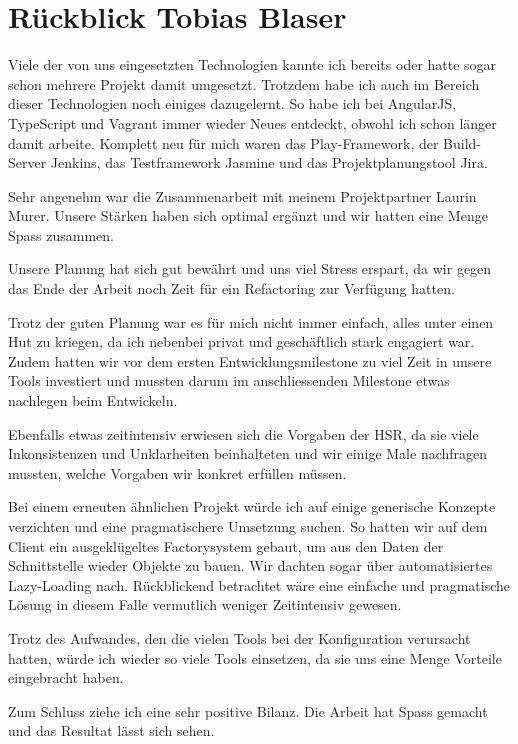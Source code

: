 	\section*{Rückblick Tobias Blaser}
		
		
		Viele der von uns eingesetzten Technologien kannte ich bereits oder hatte sogar schon mehrere Projekt damit umgesetzt.
		Trotzdem habe ich auch im Bereich dieser Technologien noch einiges dazugelernt.
		So habe ich bei AngularJS, TypeScript und Vagrant immer wieder Neues entdeckt, obwohl ich schon länger damit arbeite.
		Komplett neu für mich waren das Play-Framework, der Build-Server Jenkins, das Testframework Jasmine und das Projektplanungstool Jira.
		
		
		Sehr angenehm war die Zusammenarbeit mit meinem Projektpartner Laurin Murer. Unsere Stärken haben sich optimal ergänzt und wir hatten eine Menge Spass zusammen.
		
		Unsere Planung hat sich gut bewährt und uns viel Stress erspart, da wir gegen das Ende der Arbeit noch Zeit für ein Refactoring zur Verfügung hatten.
		
		
		Trotz der guten Planung war es für mich nicht immer einfach, alles unter einen Hut zu kriegen, da ich nebenbei privat und geschäftlich stark engagiert war.
		Zudem hatten wir vor dem ersten Entwicklungsmilestone zu viel Zeit in unsere Tools investiert und mussten darum im anschliessenden Milestone etwas nachlegen beim Entwickeln.
		
		Ebenfalls etwas zeitintensiv erwiesen sich die Vorgaben der HSR, da sie viele Inkonsistenzen und Unklarheiten beinhalteten und wir einige Male nachfragen mussten, welche Vorgaben wir konkret erfüllen müssen.
		
		
		Bei einem erneuten ähnlichen Projekt würde ich auf einige generische Konzepte verzichten und eine pragmatischere Umsetzung suchen. So hatten wir auf dem Client ein ausgeklügeltes Factorysystem gebaut, um aus den Daten der Schnittstelle wieder Objekte zu bauen.
		Wir dachten sogar über automatisiertes Lazy-Loading nach. 
		Rückblickend betrachtet wäre eine einfache und pragmatische Lösung in diesem Falle vermutlich weniger Zeitintensiv gewesen.
		

		Trotz des Aufwandes, den die vielen Tools bei der Konfiguration verursacht hatten, würde ich wieder so viele Tools einsetzen, da sie uns eine Menge Vorteile eingebracht haben.
				
		
		Zum Schluss ziehe ich eine sehr positive Bilanz.
		Die Arbeit hat Spass gemacht und das Resultat lässt sich sehen.